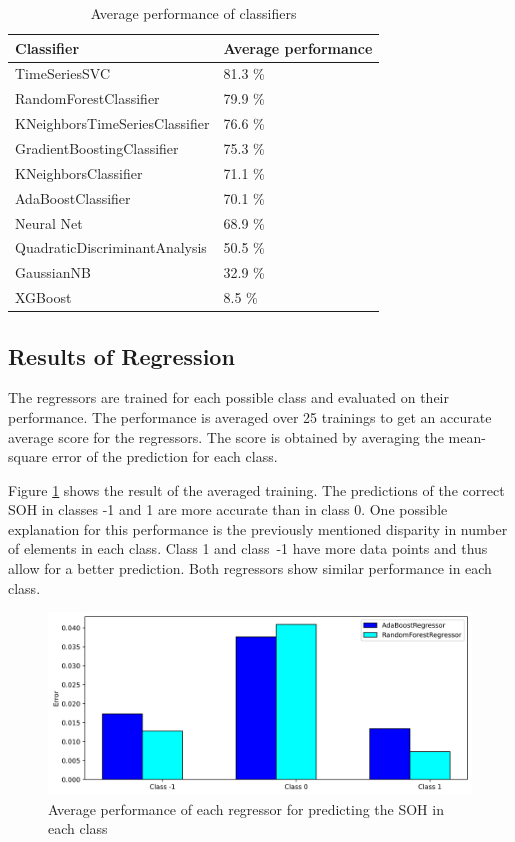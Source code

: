 \begin{table}
	\begin{center}
		\begin{tabular}{|| l | l ||}
			\hline
			\rule{0pt}{2ex}Classifier & Average performance\\
			\hline
			\hline
			\rule{0pt}{2ex}TimeSeriesSVC & 81.3 \%\\	\hline
			RandomForestClassifier & 79.9 \% \\ \hline
			KNeighborsTimeSeriesClassifier & 76.6 \%\\ \hline
			GradientBoostingClassifier & 75.3 \%\\ \hline
			KNeighborsClassifier & 71.1 \%\\ \hline
			AdaBoostClassifier & 70.1 \% \\ \hline
			Neural Net & 68.9 \% \\ \hline
			QuadraticDiscriminantAnalysis & 50.5 \% \\ \hline
			GaussianNB & 32.9 \% \\ \hline
			XGBoost & 8.5 \% \\ \hline

		\end{tabular}
		\caption{Average performance of classifiers}
		\label{score}
	\end{center}
	\vspace{-4mm}
\end{table}
\newpage
\subsection{Results of Regression}

The regressors are trained for each possible class and evaluated on their performance. The performance is averaged over 25 trainings to get an accurate average score for the regressors. The score is obtained by averaging the mean-square error of the prediction for each class.

Figure \ref{fig:avgperf_reg} shows the result of the averaged training. The predictions of the correct SOH in classes -1 and 1 are more accurate than in class 0. One possible explanation for this performance is the previously mentioned disparity in number of elements in each class. Class 1 and class~-1 have more data points and thus allow for a better prediction. Both regressors show similar performance in each class.

\begin{figure}[H]
	\centering
	\includegraphics[width=1\linewidth]{IMGs/Average_performance_REG.png}
	\caption{Average performance of each regressor for predicting the SOH in each class}
	\label{fig:avgperf_reg}
\end{figure}
